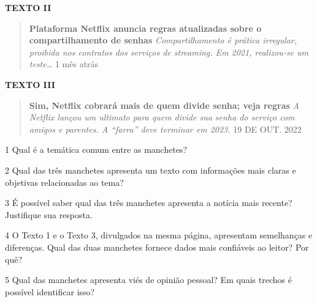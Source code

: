 \textbf{TEXTO II}

\begin{quote}
\textbf{Plataforma Netflix anuncia regras atualizadas sobre o
compartilhamento de senhas} \emph{Compartilhamento é prática irregular,
proibida nos contratos dos serviços de streaming. Em 2021, realizou-se
um teste\ldots{}} 1 mês atrás
\end{quote}

\textbf{TEXTO III}

\begin{quote}
\textbf{Sim, Netflix cobrará mais de quem divide senha; veja regras}
\emph{A Netflix lançou um ultimato para quem divide sua senha do serviço
com amigos e parentes. A ``farra'' deve terminar em 2023.} 19 DE OUT.
2022
\end{quote}

\num{1} Qual é a temática comum entre as manchetes?



\num{2} Qual das três manchetes apresenta um texto com informações mais
claras e objetivas relacionadas ao tema?



\num{3} É possível saber qual das três manchetes apresenta a notícia
mais recente? Justifique sua resposta.



\num{4} O Texto 1 e o Texto 3, divulgados na mesma página, apresentam
semelhanças e diferenças. Qual das duas manchetes fornece dados mais
confiáveis ao leitor? Por quê?



\num{5} Qual das manchetes apresenta viés de opinião pessoal? Em quais
trechos é possível identificar isso?



